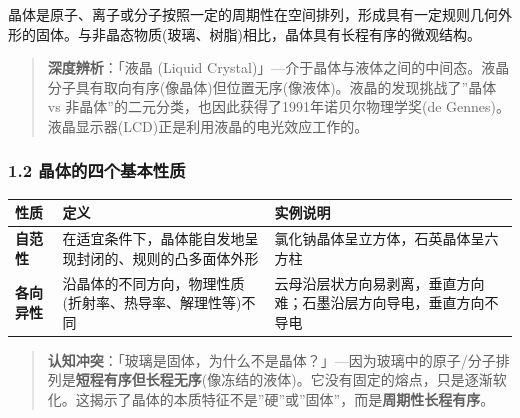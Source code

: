\documentclass[a4paper,11pt]{ctexart}
\newcounter{none}
\newcommand{\箭}{\ensuremath{\rightarrow}}
\newcommand{\左箭}{\ensuremath{\leftarrow}}
\newcommand{\上箭}{\ensuremath{\uparrow}}
\newcommand{\下箭}{\ensuremath{\downarrow}}
\newcommand{\衡}{\ensuremath{\rightleftharpoons}}
\newcommand{\双箭}{\ensuremath{\leftrightarrow}}
\newcommand{\约等于}{\ensuremath{\approx}}
\newcommand{\小于等于}{\ensuremath{\leq}}
\newcommand{\大于等于}{\ensuremath{\geq}}
\newcommand{\不等于}{\ensuremath{\neq}}
\newcommand{\西格马}{\ensuremath{\sigma}}
\newcommand{\派}{\ensuremath{\pi}}
\begin{document}
晶体是原子、离子或分子按照一定的周期性在空间排列，形成具有一定规则几何外形的固体。与非晶态物质(玻璃、树脂)相比，晶体具有长程有序的微观结构。

\begin{quote}
\textbf{深度辨析}：「液晶 (Liquid Crystal)」---介于晶体与液体之间的中间态。液晶分子具有取向有序(像晶体)但位置无序(像液体)。液晶的发现挑战了''晶体 vs 非晶体''的二元分类，也因此获得了1991年诺贝尔物理学奖(de Gennes)。液晶显示器(LCD)正是利用液晶的电光效应工作的。
\end{quote}

\subsubsection{1.2 晶体的四个基本性质}\label{ux6676ux4f53ux7684ux56dbux4e2aux57faux672cux6027ux8d28}

{\def\LTcaptype{none} %
\begin{longtable}[]{@{}
  >{\raggedright\arraybackslash}p{}
  >{\raggedright\arraybackslash}p{}
  >{\raggedright\arraybackslash}p{}@{}}
\toprule\noalign{}
\begin{minipage}[b]{\linewidth}\raggedright
性质
\end{minipage} & \begin{minipage}[b]{\linewidth}\raggedright
定义
\end{minipage} & \begin{minipage}[b]{\linewidth}\raggedright
实例说明
\end{minipage} \\
\midrule\noalign{}
\endhead
\bottomrule\noalign{}
\endlastfoot
\textbf{自范性} & 在适宜条件下，晶体能自发地呈现封闭的、规则的凸多面体外形 & 氯化钠晶体呈立方体，石英晶体呈六方柱 \\
\textbf{各向异性} & 沿晶体的不同方向，物理性质(折射率、热导率、解理性等)不同 & 云母沿层状方向易剥离，垂直方向难；石墨沿层方向导电，垂直方向不导电 \\
\end{longtable}
}

\begin{quote}
\textbf{认知冲突}：「玻璃是固体，为什么不是晶体？」---因为玻璃中的原子/分子排列是\textbf{短程有序但长程无序}(像冻结的液体)。它没有固定的熔点，只是逐渐软化。这揭示了晶体的本质特征不是''硬''或''固体''，而是\textbf{周期性长程有序}。
\end{quote}
\end{document}
